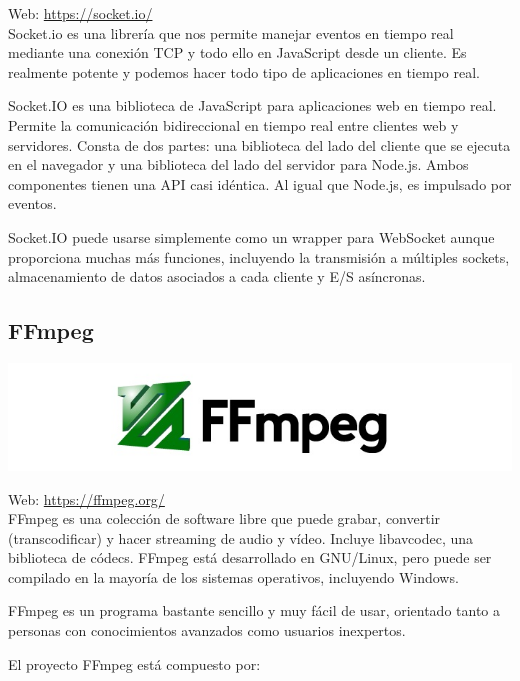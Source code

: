 Web: \url{https://socket.io/}\\

Socket.io es una librería que nos permite manejar eventos en tiempo real mediante una conexión TCP y todo ello en JavaScript desde un cliente.
Es realmente potente y podemos hacer todo tipo de aplicaciones en tiempo real. 


Socket.IO es una biblioteca de JavaScript para aplicaciones web en tiempo real. Permite la comunicación bidireccional en tiempo real entre clientes web y servidores. Consta de dos partes: una biblioteca del lado del cliente
que se ejecuta en el navegador y una biblioteca del lado del servidor para Node.js. Ambos componentes tienen una API casi idéntica. Al igual que Node.js, es impulsado por eventos.

Socket.IO puede usarse simplemente como un wrapper para WebSocket aunque proporciona muchas más funciones, incluyendo la transmisión a múltiples sockets, almacenamiento de datos asociados a cada cliente y E/S asíncronas.




\subsection{ FFmpeg }


\begin{center}
\includegraphics[scale=0.8]{imagenes/Ffmpeg-logo.jpg}
\end{center}

Web: \url{https://ffmpeg.org/}\\

FFmpeg es una colección de software libre que puede grabar, convertir (transcodificar) y hacer streaming de audio y vídeo. Incluye libavcodec, una biblioteca de códecs. FFmpeg está desarrollado en GNU/Linux, pero puede ser compilado
en la mayoría de los sistemas operativos, incluyendo Windows.

FFmpeg es un programa bastante sencillo y muy fácil de usar, orientado tanto a personas con conocimientos avanzados como usuarios inexpertos. 

El proyecto FFmpeg está compuesto por:

